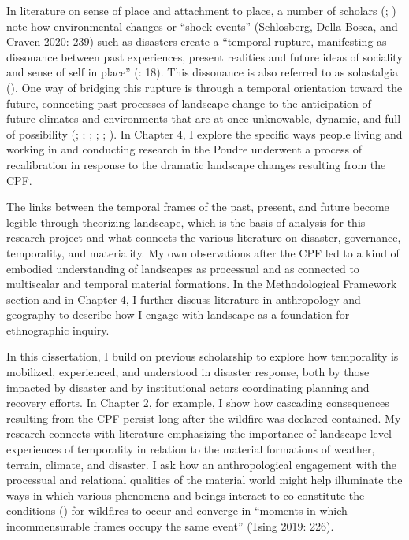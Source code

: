 \documentclass[
]{article}
\begin{document}
In literature on sense of place and attachment to place, a number of scholars (; ) note how environmental changes or ``shock events'' (Schlosberg, Della Bosca, and Craven 2020: 239) such as disasters create a ``temporal rupture, manifesting as dissonance between past experiences, present realities and future ideas of sociality and sense of self in place'' (: 18). This dissonance is also referred to as solastalgia (). One way of bridging this rupture is through a temporal orientation toward the future, connecting past processes of landscape change to the anticipation of future climates and environments that are at once unknowable, dynamic, and full of possibility (; ; ; ; ; ). In Chapter 4, I explore the specific ways people living and working in and conducting research in the Poudre underwent a process of recalibration in response to the dramatic landscape changes resulting from the CPF.

The links between the temporal frames of the past, present, and future become legible through theorizing landscape, which is the basis of analysis for this research project and what connects the various literature on disaster, governance, temporality, and materiality. My own observations after the CPF led to a kind of embodied understanding of landscapes as processual and as connected to multiscalar and temporal material formations. In the Methodological Framework section and in Chapter 4, I further discuss literature in anthropology and geography to describe how I engage with landscape as a foundation for ethnographic inquiry.

In this dissertation, I build on previous scholarship to explore how temporality is mobilized, experienced, and understood in disaster response, both by those impacted by disaster and by institutional actors coordinating planning and recovery efforts. In Chapter 2, for example, I show how cascading consequences resulting from the CPF persist long after the wildfire was declared contained. My research connects with literature emphasizing the importance of landscape-level experiences of temporality in relation to the material formations of weather, terrain, climate, and disaster. I ask how an anthropological engagement with the processual and relational qualities of the material world might help illuminate the ways in which various phenomena and beings interact to co-constitute the conditions () for wildfires to occur and converge in ``moments in which incommensurable frames occupy the same event'' (Tsing 2019: 226).
\end{document}
